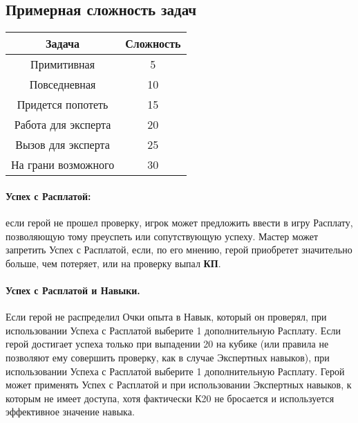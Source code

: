 \subsection{Примерная сложность задач}
\begin{center}
\begin{tabular}{ |c|c| }
\hline
\textbf{Задача} & \textbf{Сложность} \\ \hline
Примитивная & 5 \\ \hline
Повседневная & 10 \\ \hline
Придется попотеть & 15 \\ \hline
Работа для эксперта & 20 \\ \hline
Вызов для эксперта & 25 \\ \hline
На грани возможного & 30 \\ \hline
\end{tabular}
\end{center}

\paragraph{Успех с Расплатой:} если герой не прошел проверку, игрок может предложить ввести в игру Расплату, позволяющую тому преуспеть или сопутствующую успеху. Мастер может запретить Успех с Расплатой, если, по его мнению, герой приобретет значительно больше, чем потеряет, или на проверку выпал \textbf{КП}.
\paragraph{Успех с Расплатой и Навыки.} Если герой не распределил Очки опыта в Навык, который он проверял, при использовании Успеха с Расплатой выберите 1 дополнительную Расплату. 
\newline Если герой достигает успеха только при выпадении 20 на кубике (или правила не позволяют ему совершить проверку, как в случае Экспертных навыков), при использовании Успеха с Расплатой выберите 1 дополнительную Расплату. 
\newline \tbd Герой может применять Успех с Расплатой и при использовании Экспертных навыков, к которым не имеет доступа, хотя фактически К20 не бросается и используется эффективное значение навыка.

